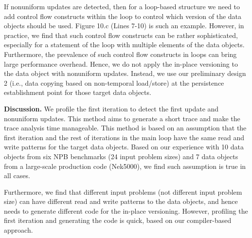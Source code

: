 If nonuniform updates are detected, then for a loop-based structure we need to add control flow constructs within the loop to control which version of the data objects should be used.
Figure 10.c (Lines 7-10) is such an example. 
However, in practice, we find that such control flow constructs can be rather sophisticated, especially for a statement of the loop with multiple elements of the data objects. Furthermore, 
the prevalence of such control flow constructs in loops can bring
large performance overhead. 
Hence, we do not apply the in-place versioning to the data object with nonuniform updates.
Instead, we use our preliminary design 2 (i.e., data copying based on non-temporal load/store) at the persistence establishment point for those target data objects.

\textbf{Discussion.}
We profile the first iteration to detect the first update and nonuniform updates.
This method aims to generate a short trace and make the trace analysis time manageable.
This method is based on an assumption that the first iteration and the rest of
iterations in the main loop have the same read and write patterns for the target data objects.
Based on our experience with 10 data objects from six NPB benchmarks (24 input problem sizes) and 7 data objects from a large-scale production code (Nek5000), we find such assumption is true in all cases.

Furthermore, we find that different input problems (not different input problem size) can have different read and write patterns to the data objects, and hence needs to generate different code for the in-place versioning.
However, profiling the first iteration and generating the code is quick, based on our compiler-based approach.

